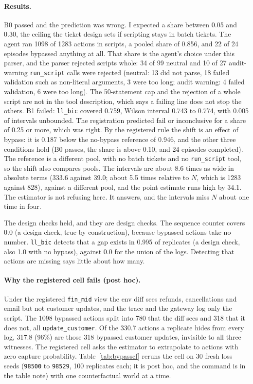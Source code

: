 \documentclass[11pt]{article}
\begin{document}
\paragraph{Results.} B0 passed and the prediction was wrong. I expected a share
between 0.05 and 0.30, the ceiling the ticket design sets if scripting stays in
batch tickets. The agent ran 1098 of 1283 actions in scripts, a pooled share of
0.856, and 22 of 24 episodes bypassed anything at all. That share is the agent's choice
under this parser, and the parser rejected scripts whole: 34 of 99 neutral and 10 of 27
audit-warning \texttt{run\_script} calls were rejected (neutral: 13 did not parse, 18
failed validation such as non-literal arguments, 3 were too long; audit warning: 4 failed
validation, 6 were too long). The 50-statement cap
and the rejection of a whole script are not in the tool description, which says a failing
line does not stop the others. B1 failed:
\texttt{ll\_bic} covered 0.759, Wilson interval 0.743 to 0.774, with 0.005 of
intervals unbounded. The registration predicted fail or inconclusive for a share of
0.25 or more, which was right. By the registered rule the shift is an effect of
bypass: it is 0.187 below the no-bypass reference of 0.946, and the other three
conditions hold (B0 passes, the share is above 0.10, and 24 episodes completed).
The reference is a different pool, with no batch tickets and no
\texttt{run\_script} tool, so the shift also compares pools. The intervals are
about 8.6 times as wide in absolute terms (333.6 against 39.0; about 5.5 times
relative to $N$, which is 1283 against 828), against a different pool, and the point
estimate runs high by 34.1. The estimator is not refusing here. It answers, and
the intervals miss $N$ about one time in four.

The design checks held, and they are design checks. The sequence counter covers 0.0
(a design check, true by construction), because bypassed actions take no number.
\texttt{ll\_bic} detects that a gap exists in 0.995 of replicates (a design check, also
1.0 with no bypass), against 0.0 for the union of the logs. Detecting that
actions are missing says little about how many.

\paragraph{Why the registered cell fails (post hoc).} Under the registered
\texttt{fin\_mid} view the env diff sees refunds, cancellations and email but not
customer updates, and the trace and the gateway log only the script. The 1098
bypassed actions split into 780 that the diff sees and 318 that it does not, all
\texttt{update\_customer}. Of the 330.7 actions a replicate hides from every log, 317.8
(96\%) are those 318 bypassed customer updates, invisible to all three witnesses. The
registered cell asks the estimator to extrapolate to actions with zero capture
probability. Table~\ref{tab:bypasscf} reruns the cell on 30 fresh loss seeds
(\texttt{98500} to \texttt{98529}, 100 replicates each; it is post hoc, and the command is
in the table note) with one counterfactual world at a time.
\end{document}
